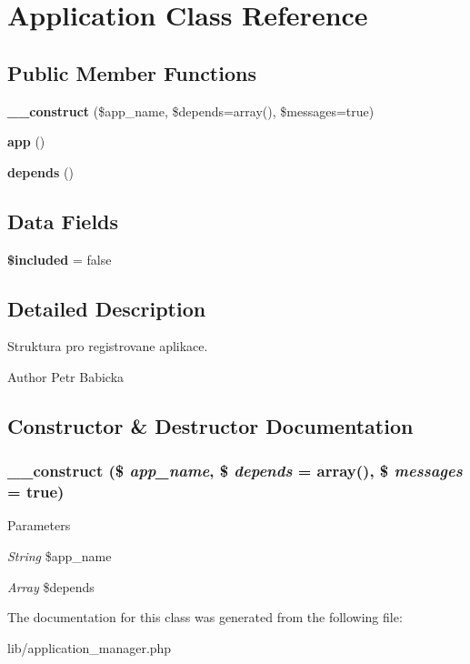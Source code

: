 \section{Application Class Reference}
\label{class_application}
\subsection*{Public Member Functions}
\begin{DoxyCompactItemize}
\item 
{\bf \_\-\_\-construct} (\$app\_\-name, \$depends=array(), \$messages=true)
\item 
{\bfseries app} ()\label{class_application_a0b328204f1494443b4573c43d2bab29e}

\item 
{\bfseries depends} ()\label{class_application_a2b1b71da3eb2fe72d51da4e9309152ad}

\end{DoxyCompactItemize}
\subsection*{Data Fields}
\begin{DoxyCompactItemize}
\item 
{\bfseries \$included} = false\label{class_application_afc44ef0981a4c72dfc03aba296639cb4}

\end{DoxyCompactItemize}


\subsection{Detailed Description}
Struktura pro registrovane aplikace. \begin{DoxyAuthor}{Author}
Petr Babicka 
\end{DoxyAuthor}


\subsection{Constructor \& Destructor Documentation}
\subsubsection[{\_\-\_\-construct}]{\setlength{\rightskip}{0pt plus 5cm}\_\-\_\-construct (\$ {\em app\_\-name}, \/  \$ {\em depends} = {\ttfamily array()}, \/  \$ {\em messages} = {\ttfamily true})}\label{class_application_a32a195a9fb26ab28caea62fa894d7c51}

\begin{DoxyParams}{Parameters}
\item[{\em String}]\$app\_\-name \item[{\em Array}]\$depends \end{DoxyParams}


The documentation for this class was generated from the following file:\begin{DoxyCompactItemize}
\item 
lib/application\_\-manager.php\end{DoxyCompactItemize}
